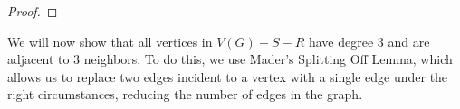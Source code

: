 \documentclass{article}
\begin{document}
\begin{proof}
\end{proof}

We will now show that all vertices in $V(G)-S-R$ have degree 3 and are adjacent to 3 neighbors. To do this, we use Mader's Splitting Off Lemma, which allows us to replace two edges incident to a vertex with a single edge under the right circumstances, reducing the number of edges in the graph.
\end{document}
